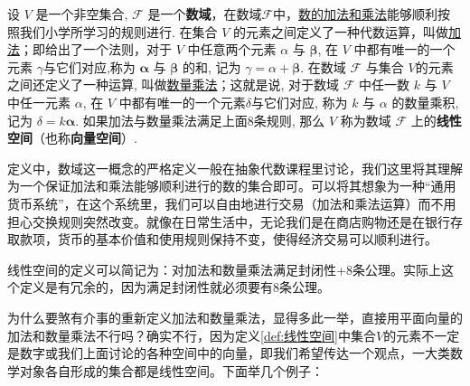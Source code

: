 
\begin{definition}[线性空间]
\label{def:线性空间}
设 $V$ 是一个非空集合, $\mathcal{F}$ 是一个\textcolor{third}{\bf 数域}，在数域$\mathcal{F}$中，\underline{数的加法和乘法}能够顺利按照我们小学所学习的规则进行. 在集合 $V$ 的元素之间定义了一种代数运算，叫做\underline{加法}；即给出了一个法则，对于 $V$ 中任意两个元素 $\alpha$ 与 $\boldsymbol{\beta}$, 在 $V$ 中都有唯一的一个元素 $\gamma$与它们对应,称为 $\boldsymbol{\alpha}$ 与 $\boldsymbol{\beta}$ 的和, 记为 $\gamma=\alpha+\boldsymbol{\beta}$. 在数域 $\mathcal{F}$ 与集合 $V$的元素之间还定义了一种运算, 叫做\underline{数量乘法}；这就是说, 对于数域 $\mathcal{F}$ 中任一数 $k$ 与 $V$ 中任一元素 $\alpha$, 在 $V$ 中都有唯一的一个元素$\delta$与它们对应, 称为 $k$ 与 $\alpha$ 的数量乘积, 记为 $\delta=k \boldsymbol{\alpha}$. 如果加法与数量乘法满足上面8条规则, 那么 $V$ 称为数域 $\mathcal{F}$ 上的\textcolor{third}{\bf 线性空间}（也称\textcolor{third}{\bf 向量空间}）.
\end{definition}

定义中，数域这一概念的严格定义一般在抽象代数课程里讨论，我们这里将其理解为一个保证加法和乘法能够顺利进行的数的集合即可。可以将其想象为一种“通用货币系统”，在这个系统里，我们可以自由地进行交易（加法和乘法运算）而不用担心交换规则突然改变。就像在日常生活中，无论我们是在商店购物还是在银行存取款项，货币的基本价值和使用规则保持不变，使得经济交易可以顺利进行。

\vspace{0.3cm}

\begin{note}
    线性空间的定义可以简记为：对加法和数量乘法满足封闭性+8条公理。实际上这个定义是有冗余的，因为满足封闭性就必须要有8条公理。
\end{note}

\vspace{0.3cm}

为什么要煞有介事的重新定义加法和数量乘法，显得多此一举，直接用平面向量的加法和数量乘法不行吗？确实不行，因为定义\ref{def:线性空间}中集合$V$的元素不一定是数字或我们上面讨论的各种空间中的向量，即我们希望传达一个观点，一大类数学对象各自形成的集合都是线性空间。下面举几个例子：

